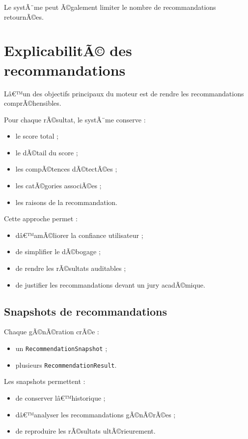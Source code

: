 ﻿\documentclass[12pt,a4paper]{report}
\begin{document}
Le systÃ¨me peut Ã©galement limiter le nombre de recommandations retournÃ©es.

\section{ExplicabilitÃ© des recommandations}

Lâ€™un des objectifs principaux du moteur est de rendre les recommandations comprÃ©hensibles.

Pour chaque rÃ©sultat, le systÃ¨me conserve :
\begin{itemize}
    \item le score total ;
    \item le dÃ©tail du score ;
    \item les compÃ©tences dÃ©tectÃ©es ;
    \item les catÃ©gories associÃ©es ;
    \item les raisons de la recommandation.
\end{itemize}

Cette approche permet :
\begin{itemize}
    \item dâ€™amÃ©liorer la confiance utilisateur ;
    \item de simplifier le dÃ©bogage ;
    \item de rendre les rÃ©sultats auditables ;
    \item de justifier les recommandations devant un jury acadÃ©mique.
\end{itemize}

\subsection{Snapshots de recommandations}

Chaque gÃ©nÃ©ration crÃ©e :
\begin{itemize}
    \item un \texttt{RecommendationSnapshot} ;
    \item plusieurs \texttt{RecommendationResult}.
\end{itemize}

Les snapshots permettent :
\begin{itemize}
    \item de conserver lâ€™historique ;
    \item dâ€™analyser les recommandations gÃ©nÃ©rÃ©es ;
    \item de reproduire les rÃ©sultats ultÃ©rieurement.
\end{itemize}
\end{document}
